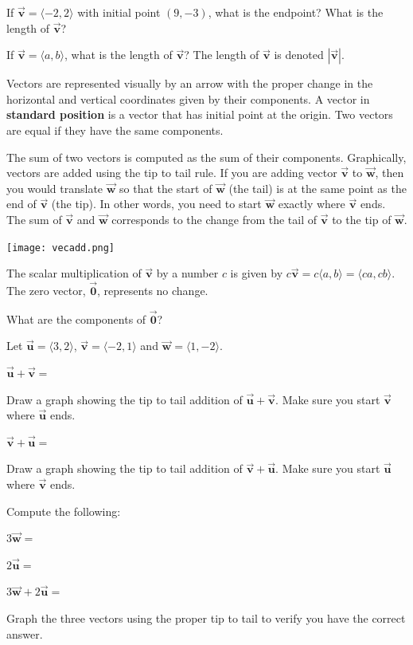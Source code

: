 \bq If $\vec{\textbf{v}}= \langle -2,2\rangle $ with initial point $(9,-3)$, what is the endpoint? What is the length of $\vec{\textbf{v}}$?
\eq

\bq If $\vec{\textbf{v}}= \langle a,b\rangle $, what is the length of $\vec{\textbf{v}}$? The length of $\vec{\textbf{v}}$ is denoted $|\vec{\textbf{v}}|$.
\eq


\begin{info} Vectors are represented visually by an arrow with the proper change in the horizontal and vertical coordinates given by their components. A vector in \textbf{standard position} is a vector that has initial point at the origin. Two vectors are equal if they have the same components.

The sum of two vectors is computed as the sum of their components. Graphically, vectors are added using the tip to tail rule. If you are adding vector $\vec{\textbf{v}}$ to $\vec{\textbf{w}}$, then you would translate $\vec{\textbf{w}}$ so that the start of $\vec{\textbf{w}}$ (the tail) is at the same point as the end of $\vec{\textbf{v}}$ (the tip). In other words, you need to start $\vec{\textbf{w}}$ exactly where $\vec{\textbf{v}}$ ends. The sum of $\vec{\textbf{v}}$ and $\vec{\textbf{w}}$ corresponds to the change from the tail of $\vec{\textbf{v}}$ to the tip of $\vec{\textbf{w}}$.

\begin{center} \texttt{[image: vecadd.png]} \end{center}

The scalar multiplication of $\vec{\textbf{v}}$ by a number $c$ is given by $c \vec{\textbf{v}} = c \langle a,b\rangle=\langle ca,cb\rangle$. The zero vector, $\vec{\textbf{0}}$, represents no change. \end{info}

\bq What are the components of $\vec{\textbf{0}}$? \eq

\bq Let $\vec{\textbf{u}}=\langle 3,2 \rangle$, $\vec{\textbf{v}}=\langle -2,1 \rangle$ and $\vec{\textbf{w}}=\langle 1,-2\rangle$.
\be \item $\vec{\textbf{u}} + \vec{\textbf{v}}=$
\item Draw a graph showing the tip to tail addition of $\vec{\textbf{u}} + \vec{\textbf{v}}$. Make sure you start $\vec{\textbf{v}}$ where $\vec{\textbf{u}}$ ends.
\item $\vec{\textbf{v}} + \vec{\textbf{u}}=$
\item Draw a graph showing the tip to tail addition of $\vec{\textbf{v}} + \vec{\textbf{u}}$. Make sure you start $\vec{\textbf{u}}$ where $\vec{\textbf{v}}$ ends.
\item Compute the following:
\be
\item $3 \vec{\textbf{w}} =$
\item $2 \vec{\textbf{u}} =$
\item $3 \vec{\textbf{w}} + 2 \vec{\textbf{u}} =$
\ee
\item Graph the three vectors using the proper tip to tail to verify you have the correct answer.
\ee
\eq



